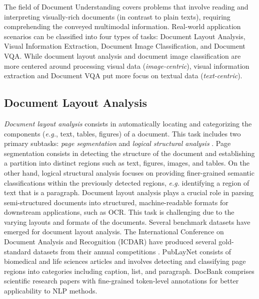 The field of Document Understanding covers problems that involve reading and interpreting visually-rich documents (in contrast to plain texts), requiring comprehending the conveyed multimodal information. Real-world application scenarios can be classified into four types of tasks: Document Layout Analysis, Visual Information Extraction, Document Image Classification, and \ac{Document VQA}. While document layout analysis and document image classification are more centered around processing visual data (\textit{image-centric}), visual information extraction and \ac{Document VQA} put more focus on textual data (\textit{text-centric}).

\subsection{Document Layout Analysis}

\textit{Document layout analysis} consists in automatically locating and categorizing the components (\textit{e.g.}, text, tables, figures) of a document. This task includes two primary subtasks: \textit{page segmentation} and \textit{logical structural analysis} \citep{binmakhashen2019document}. Page segmentation consists in detecting the structure of the document and establishing a partition into distinct regions such as text, figures, images, and tables. On the other hand, logical structural analysis focuses on providing finer-grained semantic classifications within the previously detected regions, \textit{e.g.} identifying a region of text that is a paragraph. Document layout analysis plays a crucial role in parsing semi-structured documents into structured, machine-readable formats for downstream applications, such as \ac{OCR}. This task is challenging due to the varying layouts and formats of the documents. Several benchmark datasets have emerged for document layout analysis. The International Conference on Document Analysis and Recognition (ICDAR) have produced several gold-standard datasets from their annual competitions \citep{antonacopoulos2013icdar, gao2017icdar2017}. PubLayNet \citep{zhong2019publaynet} consists of biomedical and life sciences articles and involves detecting and classifying page regions into categories including caption, list, and paragraph. 
DocBank \citep{li2020docbank} comprises scientific research papers with fine-grained token-level annotations for better applicability to \ac{NLP} methods.

